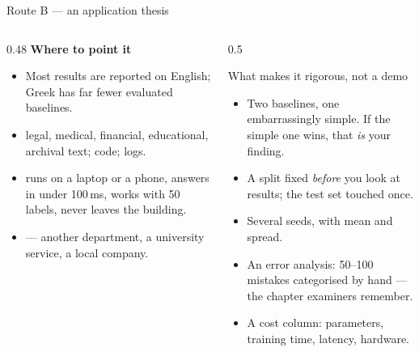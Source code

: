\documentclass[aspectratio=169,11pt]{beamer}
\begin{document}
\begin{frame}{Route B --- an application thesis}
\begin{columns}[T]
\begin{column}{0.48\textwidth}
\textbf{Where to point it}
\footnotesize
\begin{itemize}
  \item {} Most results are reported on
        English; Greek has far fewer evaluated baselines.
  \item {} legal, medical, financial,
        educational, archival text; code; logs.
  \item {} runs on a laptop or a phone, answers in
        under 100\,ms, works with 50 labels, never leaves the building.
  \item {} --- another department, a
        university service, a local company.
\end{itemize}
\end{column}
\begin{column}{0.5\textwidth}
\begin{block}{What makes it rigorous, not a demo}
\footnotesize
\begin{itemize}
  \item Two baselines, one embarrassingly simple. If the simple one wins, that
        \emph{is} your finding.
  \item A split fixed \emph{before} you look at results; the test set touched
        once.
  \item Several seeds, with mean and spread.
  \item An error analysis: 50--100 mistakes categorised by hand --- the chapter
        examiners remember.
  \item A cost column: parameters, training time, latency, hardware.
\end{itemize}
\end{block}
\end{column}
\end{columns}
\end{frame}
\end{document}
